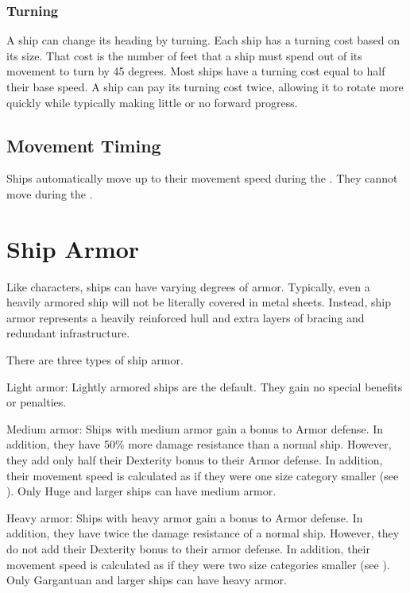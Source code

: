         \subsubsection{Turning}
            A ship can change its heading by turning.
            Each ship has a turning cost based on its size.
            That cost is the number of feet that a ship must spend out of its movement to turn by 45 degrees.
            Most ships have a turning cost equal to half their base speed.
            A ship can pay its turning cost twice, allowing it to rotate more quickly while typically making little or no forward progress.

    \subsection{Movement Timing}
        Ships automatically move up to their movement speed during the .
        They cannot move during the .

\section{Ship Armor}
    Like characters, ships can have varying degrees of armor.
    Typically, even a heavily armored ship will not be literally covered in metal sheets.
    Instead, ship armor represents a heavily reinforced hull and extra layers of bracing and redundant infrastructure.

    There are three types of ship armor.
    \begin{raggeditemize}
        \item Light armor: Lightly armored ships are the default. They gain no special benefits or penalties.
        \item Medium armor: Ships with medium armor gain a  bonus to Armor defense.
            In addition, they have 50\% more damage resistance than a normal ship.
            However, they add only half their Dexterity bonus to their Armor defense.
            In addition, their movement speed is calculated as if they were one size category smaller (see ).
            Only Huge and larger ships can have medium armor.
        \item Heavy armor: Ships with heavy armor gain a  bonus to Armor defense.
            In addition, they have twice the damage resistance of a normal ship.
            However, they do not add their Dexterity bonus to their armor defense.
            In addition, their movement speed is calculated as if they were two size categories smaller (see ).
            Only Gargantuan and larger ships can have heavy armor.
    \end{raggeditemize}


